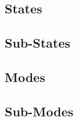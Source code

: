 
\subsection{States}
\label{sec:SaM_States}


\subsection{Sub-States}
\label{sec:SaM_SubStates}


\subsection{Modes}
\label{sec:SaM_Modes}


\subsection{Sub-Modes}
\label{sec:SaM_SubModes}



